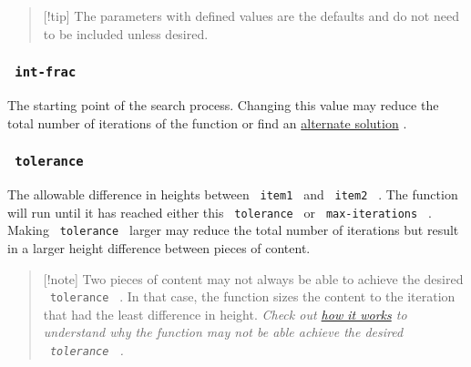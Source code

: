 \begin{quote}
{[}!tip{]} The parameters with defined values are the defaults and do
not need to be included unless desired.
\end{quote}

\begin{Shaded}
\begin{Highlighting}[]
\NormalTok{)}
\end{Highlighting}
\end{Shaded}

\subsubsection{\texorpdfstring{\texttt{\ int-frac\ }}{ int-frac }}\label{int-frac}

The starting point of the search process. Changing this value may reduce
the total number of iterations of the function or find an
\href{https://github.com/typst/packages/raw/main/packages/preview/oasis-align/0.1.0/\#oasis-align-2}{alternate
solution} .

\subsubsection{\texorpdfstring{\texttt{\ tolerance\ }}{ tolerance }}\label{tolerance}

The allowable difference in heights between \texttt{\ item1\ } and
\texttt{\ item2\ } . The function will run until it has reached either
this \texttt{\ tolerance\ } or \texttt{\ max-iterations\ } . Making
\texttt{\ tolerance\ } larger may reduce the total number of iterations
but result in a larger height difference between pieces of content.

\begin{quote}
{[}!note{]} Two pieces of content may not always be able to achieve the
desired \texttt{\ tolerance\ } . In that case, the function sizes the
content to the iteration that had the least difference in height.
\emph{Check out
\href{https://github.com/typst/packages/raw/main/packages/preview/oasis-align/0.1.0/\#oasis-align-2}{how
it works} to understand why the function may not be able achieve the
desired \texttt{\ tolerance\ } .}
\end{quote}

